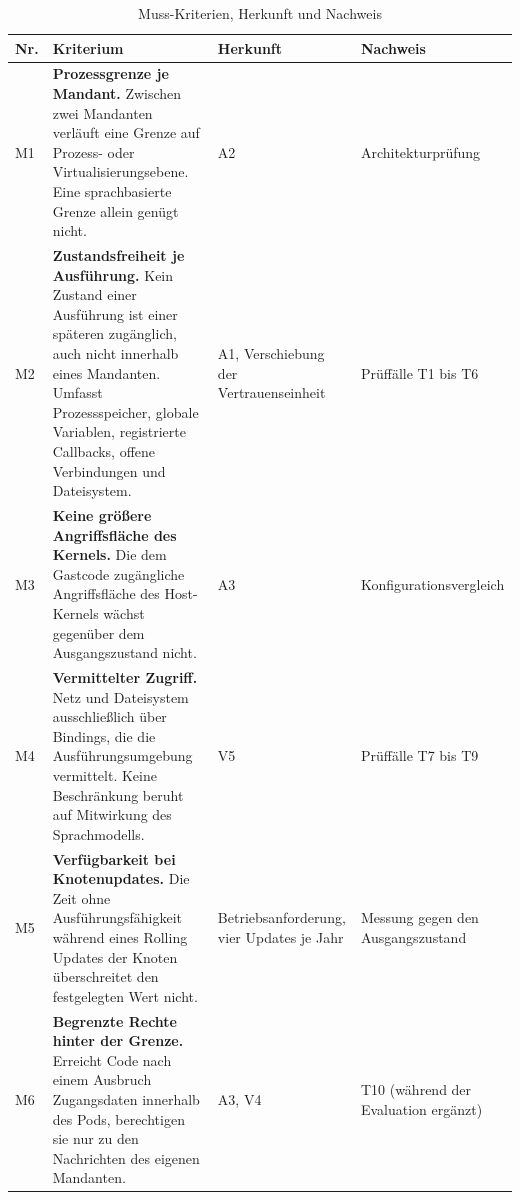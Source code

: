 \begin{table}[H]
  \caption{Muss-Kriterien, Herkunft und Nachweis}
  \label{tab:musskriterien}
  \small
  \begin{tabularx}{\textwidth}{@{}l >{\RaggedRight\arraybackslash}X >{\RaggedRight\arraybackslash}p{} >{\RaggedRight\arraybackslash}p{}@{}}
    \hline
    Nr. & Kriterium & Herkunft & Nachweis \\
    \hline
    M1 & \textbf{Prozessgrenze je Mandant.} Zwischen zwei Mandanten verläuft eine Grenze auf
         Prozess- oder Virtualisierungsebene. Eine sprachbasierte Grenze allein genügt nicht. &
         A2 & Architektur\-prüfung \\[2pt]
    M2 & \textbf{Zustandsfreiheit je Ausführung.} Kein Zustand einer Ausführung ist einer
         späteren zugänglich, auch nicht innerhalb eines Mandanten. Umfasst Prozessspeicher,
         globale Variablen, registrierte Callbacks, offene Verbindungen und Dateisystem. &
         A1, Verschiebung der Vertrauens\-einheit & Prüffälle T1 bis T6 \\[2pt]
    M3 & \textbf{Keine größere Angriffsfläche des Kernels.} Die dem Gastcode zugängliche Angriffsfläche des
         Host-Kernels wächst gegenüber dem Ausgangszustand nicht. &
         A3 & Konfigurations\-vergleich \\[2pt]
    M4 & \textbf{Vermittelter Zugriff.} Netz und Dateisystem ausschließlich über Bindings, die
         die Ausführungsumgebung vermittelt. Keine Beschränkung beruht auf Mitwirkung des
         Sprachmodells. & V5 & Prüffälle T7 bis T9 \\[2pt]
    M5 & \textbf{Verfügbarkeit bei Knotenupdates.} Die Zeit ohne Ausführungsfähigkeit während
         eines Rolling Updates der Knoten überschreitet den festgelegten Wert nicht. &
         Betriebs\-anforderung, vier Updates je Jahr & Messung gegen den Ausgangszustand \\[2pt]
    M6 & \textbf{Begrenzte Rechte hinter der Grenze.} Erreicht Code nach einem Ausbruch Zugangsdaten innerhalb des Pods,
         berechtigen sie nur zu den Nachrichten des eigenen Mandanten. &
         A3, V4 & T10 (während der Evaluation ergänzt) \\
    \hline
  \end{tabularx}
\end{table}

